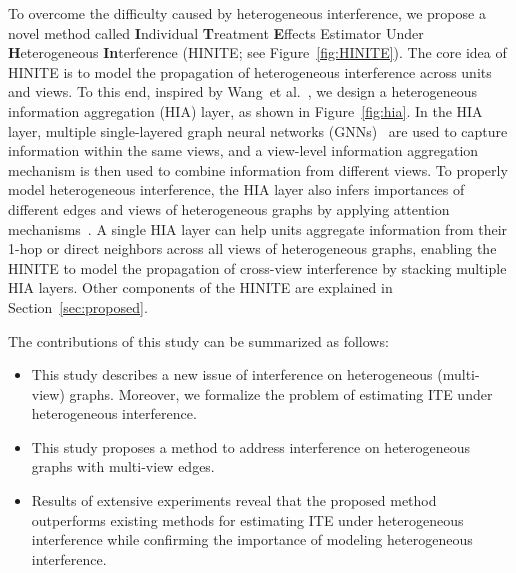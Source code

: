 \documentclass[runningheads]{llncs}
\newcommand{\etal}{{et al.}}
\begin{document}
To overcome the difficulty caused by heterogeneous interference, we propose a novel method called \textbf{I}ndividual \textbf{T}reatment \textbf{E}ffects Estimator Under \textbf{H}eterogeneous \textbf{In}terference (HINITE; see Figure~\ref{fig:HINITE}).
The core idea of HINITE is to model the propagation of heterogeneous interference across units and views.
To this end, inspired by Wang~\etal~\cite{wang2019heterogeneous}, we design a heterogeneous information aggregation (HIA) layer, as shown in Figure~\ref{fig:hia}. 
In the HIA layer, multiple single-layered graph neural networks (GNNs)~\cite{kipf2016semi} are used to capture information within the same views, and a view-level information aggregation mechanism is then used to combine information from different views.
To properly model heterogeneous interference, the HIA layer also infers importances of different edges and views of heterogeneous graphs by applying attention mechanisms~\cite{vaswani2017attention,vel2018graph,wang2019heterogeneous}.
A single HIA layer can help units aggregate information from their 1-hop or direct neighbors across all views of heterogeneous graphs, enabling the HINITE to model the propagation of cross-view interference  by  stacking multiple HIA layers. Other components of the HINITE are explained in Section~\ref{sec:proposed}.

The contributions of this study can be summarized as follows:
\begin{itemize}
    \item This study describes a new issue of interference on heterogeneous (multi-view) graphs. Moreover, we formalize the problem of estimating ITE under heterogeneous interference.
    \item This study proposes a method to address interference on heterogeneous graphs with multi-view edges.
    \item Results of extensive experiments reveal that the proposed method outperforms existing methods for estimating ITE under heterogeneous interference while confirming the importance of modeling heterogeneous interference.
\end{itemize}
\end{document}
